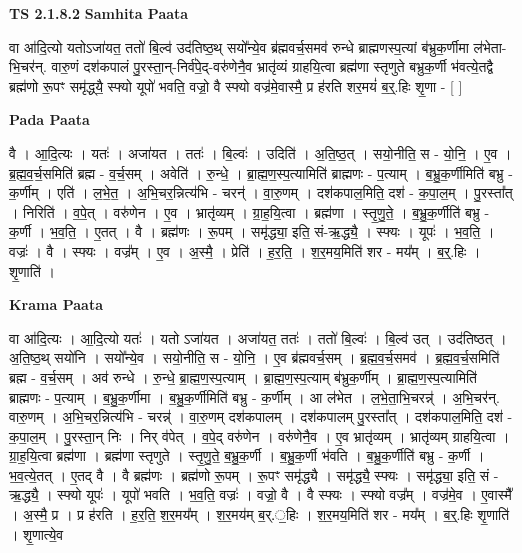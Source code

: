 \documentclass[17pt]{extarticle}
\begin{document}
\textbf{TS 2.1.8.2 } \newline
\textbf{Samhita Paata} \newline

वा आ॑दि॒त्यो यतोऽजा॑यत॒ ततो॑ बि॒ल्व॑ उद॑तिष्ठ॒थ् सयो᳚न्ये॒व ब्र॑ह्मवर्च॒समव॑ रुन्धे ब्राह्मणस्प॒त्यां ब॑भ्रुक॒र्णीमा ल॑भेता-भि॒चर॑न्. वारु॒णं दश॑कपालं पु॒रस्ता॒न्-निर्व॑पे॒द्-वरु॑णेनै॒व भ्रातृ॑व्यं ग्राहयि॒त्वा ब्रह्म॑णा स्तृणुते बभ्रुक॒र्णी भ॑वत्ये॒तद्वै ब्रह्म॑णो रू॒पꣳ समृ॑द्ध्‌यै॒ स्फ्यो यूपो॑ भवति॒ वज्रो॒ वै स्फ्यो वज्र॑मे॒वास्मै॒ प्र ह॑रति शर॒मयं॑ ब॒र्॒.हिः शृ॒णा - [  ] \newline

\textbf{Pada Paata} \newline

वै । आ॒दि॒त्यः । यतः॑ । अजा॑यत । ततः॑ । बि॒ल्वः॑ । उदिति॑ । अ॒ति॒ष्ठ॒त् । सयो॒नीति॒ स - यो॒नि॒ । ए॒व । ब्र॒ह्म॒व॒र्च॒समिति॑ ब्रह्म - व॒र्च॒सम् । अवेति॑ । रु॒न्धे॒ । ब्रा॒ह्म॒ण॒स्प॒त्यामिति॑ ब्राह्मणः - प॒त्याम् । ब॒भ्रु॒क॒र्णीमिति॑ बभ्रु - क॒र्णीम् । एति॑ । ल॒भे॒त॒ । अ॒भि॒चर॒न्नित्य॑भि - चरन्॑ । वा॒रु॒णम् । दश॑कपाल॒मिति॒ दश॑ - क॒पा॒ल॒म् । पु॒रस्ता᳚त् । निरिति॑ । व॒पे॒त् । वरु॑णेन । ए॒व । भ्रातृ॑व्यम् । ग्रा॒ह॒यि॒त्वा । ब्रह्म॑णा । स्तृ॒णु॒ते॒ । ब॒भ्रु॒क॒र्णीति॑ बभ्रु - क॒र्णी । भ॒व॒ति॒ । ए॒तत् । वै । ब्रह्म॑णः । रू॒पम् । समृ॑द्ध्या॒ इति॒ सं-ऋ॒द्ध्यै॒ । स्फ्यः । यूपः॑ । भ॒व॒ति॒ । वज्रः॑ । वै । स्फ्यः । वज्र᳚म् । ए॒व । अ॒स्मै॒ । प्रेति॑ । ह॒र॒ति॒ । श॒र॒मय॒मिति॑ शर - मय᳚म् । ब॒र्॒.हिः । शृ॒णाति॑ ।  \newline


\textbf{Krama Paata} \newline

वा आ॑दि॒त्यः । आ॒दि॒त्यो यतः॑ । यतो ऽजा॑यत । अजा॑यत॒ ततः॑ । ततो॑ बि॒ल्वः॑ । बि॒ल्व॑ उत् । उद॑तिष्ठत् । अ॒ति॒ष्ठ॒थ् सयो॑नि । सयो᳚न्ये॒व । सयो॒नीति॒ स - यो॒नि॒ । ए॒व ब्र॑ह्मवर्च॒सम् । ब्र॒ह्म॒व॒र्च॒समव॑ । ब्र॒ह्म॒व॒र्च॒समिति॑ ब्रह्म - व॒र्च॒सम् । अव॑ रुन्धे । रु॒न्धे॒ ब्रा॒ह्म॒ण॒स्प॒त्याम् । ब्रा॒ह्म॒ण॒स्प॒त्याम् ब॑भ्रुक॒र्णीम् । ब्रा॒ह्म॒ण॒स्प॒त्यामिति॑ ब्राह्मणः - प॒त्याम् । ब॒भ्रु॒क॒र्णीमा । ब॒भ्रु॒क॒र्णीमिति॑ बभ्रु - क॒र्णीम् । आ ल॑भेत । ल॒भे॒ता॒भि॒चरन्न्॑ । अ॒भि॒चर॑न्. वारु॒णम् । अ॒भि॒चर॒न्नित्य॑भि - चरन्न्॑ । वा॒रु॒णम् दश॑कपालम् । दश॑कपालम् पु॒रस्ता᳚त् । दश॑कपाल॒मिति॒ दश॑ - क॒पा॒ल॒म् । पु॒रस्ता॒न् निः । निर् व॑पेत् । व॒पे॒द् वरु॑णेन । वरु॑णेनै॒व । ए॒व भ्रातृ॑व्यम् । भ्रातृ॑व्यम् ग्राहयि॒त्वा । ग्रा॒ह॒यि॒त्वा ब्रह्म॑णा । ब्रह्म॑णा स्तृणुते । स्तृ॒णु॒ते॒ ब॒भ्रु॒क॒र्णी । ब॒भ्रु॒क॒र्णी भ॑वति । ब॒भ्रु॒क॒र्णीति॑ बभ्रु - क॒र्णी । भ॒व॒त्ये॒तत् । ए॒तद् वै । वै ब्रह्म॑णः । ब्रह्म॑णो रू॒पम् । रू॒पꣳ समृ॑द्ध्यै । समृ॑द्ध्यै॒ स्फ्यः । समृ॑द्ध्या॒ इति॒ सं - ऋ॒द्ध्यै॒ । स्फ्यो यूपः॑ । यूपो॑ भवति । भ॒व॒ति॒ वज्रः॑ । वज्रो॒ वै । वै स्फ्यः । स्फ्यो वज्र᳚म् । वज्र॑मे॒व । ए॒वास्मै᳚ । अ॒स्मै॒ प्र । प्र ह॑रति । ह॒र॒ति॒ श॒र॒मय᳚म् । श॒र॒मय॑म् ब॒र्.॒हिः । श॒र॒मय॒मिति॑ शर - मय᳚म् । ब॒र्॒.हिः शृ॒णाति॑ । शृ॒णात्ये॒व \newline
\end{document}
